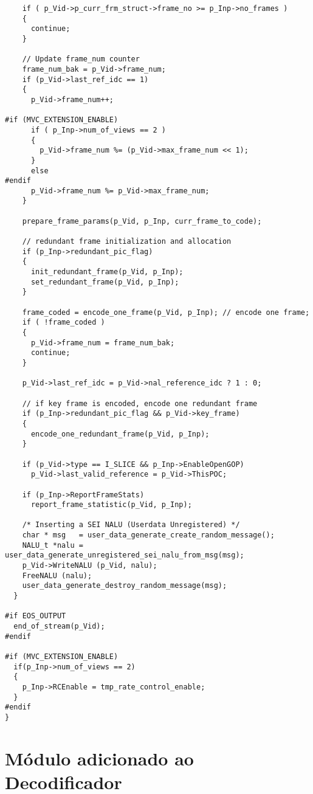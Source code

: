 \begin{lstlisting}
    if ( p_Vid->p_curr_frm_struct->frame_no >= p_Inp->no_frames )
    {
      continue;
    }

    // Update frame_num counter
    frame_num_bak = p_Vid->frame_num;
    if (p_Vid->last_ref_idc == 1)
    {      
      p_Vid->frame_num++;

#if (MVC_EXTENSION_ENABLE)
      if ( p_Inp->num_of_views == 2 )
      {
        p_Vid->frame_num %= (p_Vid->max_frame_num << 1);
      }
      else
#endif
      p_Vid->frame_num %= p_Vid->max_frame_num;
    }

    prepare_frame_params(p_Vid, p_Inp, curr_frame_to_code);

    // redundant frame initialization and allocation
    if (p_Inp->redundant_pic_flag)
    {
      init_redundant_frame(p_Vid, p_Inp);
      set_redundant_frame(p_Vid, p_Inp);
    }

    frame_coded = encode_one_frame(p_Vid, p_Inp); // encode one frame;
    if ( !frame_coded )
    {
      p_Vid->frame_num = frame_num_bak;
      continue;
    }

    p_Vid->last_ref_idc = p_Vid->nal_reference_idc ? 1 : 0;

    // if key frame is encoded, encode one redundant frame
    if (p_Inp->redundant_pic_flag && p_Vid->key_frame)
    {
      encode_one_redundant_frame(p_Vid, p_Inp);
    }

    if (p_Vid->type == I_SLICE && p_Inp->EnableOpenGOP)
      p_Vid->last_valid_reference = p_Vid->ThisPOC;

    if (p_Inp->ReportFrameStats)
      report_frame_statistic(p_Vid, p_Inp);

    /* Inserting a SEI NALU (Userdata Unregistered) */
    char * msg   = user_data_generate_create_random_message();
    NALU_t *nalu = user_data_generate_unregistered_sei_nalu_from_msg(msg);
    p_Vid->WriteNALU (p_Vid, nalu);
    FreeNALU (nalu);
    user_data_generate_destroy_random_message(msg);
  }

#if EOS_OUTPUT
  end_of_stream(p_Vid);
#endif

#if (MVC_EXTENSION_ENABLE)
  if(p_Inp->num_of_views == 2)
  {
    p_Inp->RCEnable = tmp_rate_control_enable;
  }
#endif
}
\end{lstlisting}

\section{Módulo adicionado ao Decodificador}

